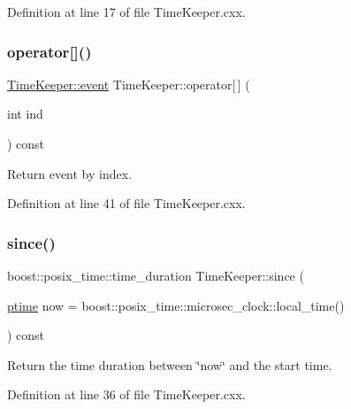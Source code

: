 Definition at line 17 of file Time\+Keeper.\+cxx.

\mbox{\label{class_wire_cell_1_1_time_keeper_a2c2df62235506b76bfa328e2a84a9593}} 
\subsubsection{\texorpdfstring{operator[]()}{operator[]()}}
{\footnotesize\ttfamily \hyperlink{class_wire_cell_1_1_time_keeper_a005e8d06f1e537abed3a83184ccfcc5e}{Time\+Keeper\+::event} Time\+Keeper\+::operator\mbox{[}$\,$\mbox{]} (\begin{DoxyParamCaption}\item[{int}]{ind }\end{DoxyParamCaption}) const}



Return event by index. 



Definition at line 41 of file Time\+Keeper.\+cxx.

\mbox{\label{class_wire_cell_1_1_time_keeper_aefe09a82b5a1c45c9cc5be83301277e4}} 
\subsubsection{\texorpdfstring{since()}{since()}}
{\footnotesize\ttfamily boost\+::posix\+\_\+time\+::time\+\_\+duration Time\+Keeper\+::since (\begin{DoxyParamCaption}\item[{\hyperlink{class_wire_cell_1_1_time_keeper_a3600404e97a1581a1c2630f92f490603}{ptime}}]{now = {\ttfamily boost\+:\+:posix\+\_\+time\+:\+:microsec\+\_\+clock\+:\+:local\+\_\+time()} }\end{DoxyParamCaption}) const}



Return the time duration between \char`\"{}now\char`\"{} and the start time. 



Definition at line 36 of file Time\+Keeper.\+cxx.

